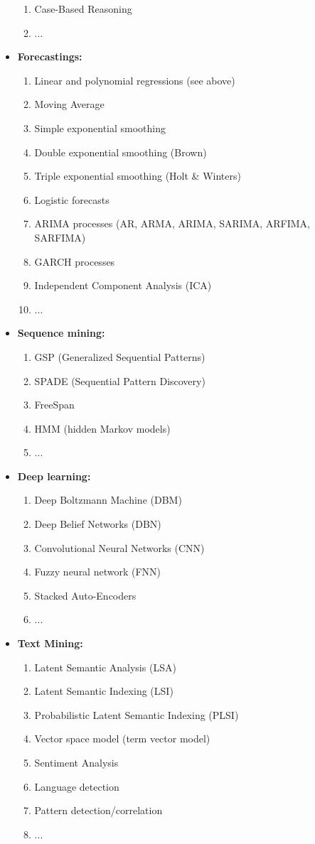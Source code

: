 \begin{itemize}
\begin{enumerate}
			\item Case-Based Reasoning 
			\item ...
		\end{enumerate}
		\item \textbf{Forecastings:}
		\begin{enumerate}
			\item Linear and polynomial regressions (see above)
			\item Moving Average
			\item Simple exponential smoothing
			\item Double exponential smoothing (Brown)
			\item Triple exponential smoothing (Holt \& Winters)
			\item Logistic forecasts
			\item ARIMA processes (AR, ARMA, ARIMA, SARIMA, ARFIMA, SARFIMA)
			\item GARCH processes
			\item Independent Component Analysis (ICA)
			\item ...
		\end{enumerate}
		\item \textbf{Sequence mining:}
		\begin{enumerate}
			\item GSP (Generalized Sequential Patterns)
			\item SPADE (Sequential Pattern Discovery)
			\item FreeSpan
			\item HMM (hidden Markov models)
			\item ...
		\end{enumerate}
		\item \textbf{Deep learning:}
		\begin{enumerate}
			\item Deep Boltzmann Machine (DBM)
			\item Deep Belief Networks (DBN)
			\item Convolutional Neural Networks (CNN)
			\item Fuzzy neural network (FNN)
			\item Stacked Auto-Encoders
			\item ...
		\end{enumerate}
		\item \textbf{Text Mining:}
		\begin{enumerate}
			\item Latent Semantic Analysis (LSA)
			\item Latent Semantic Indexing (LSI)
			\item Probabilistic Latent Semantic Indexing (PLSI)
			\item Vector space model (term vector model)
			\item Sentiment Analysis
			\item Language detection
			\item Pattern detection/correlation
			\item ...
		\end{enumerate}
	\end{itemize}
